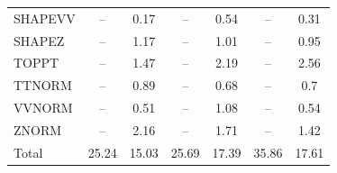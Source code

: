 \begin{table}[H]
\begin{center}
\begin{footnotesize}
\begin{tabular}{lcccccc}
				SHAPEVV & -- &  0.17 & -- &  0.54 & -- &  0.31 \\
				SHAPEZ & -- &  1.17 & -- &  1.01 & -- &  0.95 \\
				TOPPT & -- &  1.47 & -- &  2.19 & -- &  2.56 \\
				TTNORM & -- &  0.89 & -- &  0.68 & -- &  0.7 \\
				VVNORM & -- &  0.51 & -- &  1.08 & -- &  0.54 \\
				ZNORM & -- &  2.16 & -- &  1.71 & -- &  1.42 \\
				Total &  25.24  &  15.03 &  25.69  &  17.39 &  35.86  &  17.61 \\ \hline \hline
			\end{tabular}
			\label{tab:SysUncertainties_1600}
        \end{footnotesize}
	\end{center}
\end{table}



